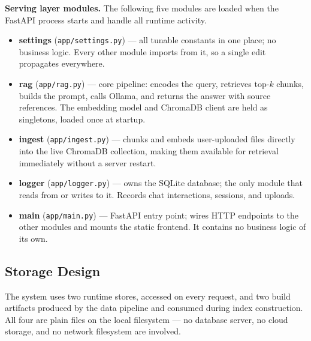 \textbf{Serving layer modules.} The following five modules are loaded when
the FastAPI process starts and handle all runtime activity.
\begin{itemize}
    \item \textbf{settings} (\texttt{app/settings.py}) --- all tunable
    constants in one place; no business logic. Every other module imports
    from it, so a single edit propagates everywhere.

    \item \textbf{rag} (\texttt{app/rag.py}) --- core pipeline: encodes the
    query, retrieves top-$k$ chunks, builds the prompt, calls Ollama, and
    returns the answer with source references. The embedding model and
    ChromaDB client are held as singletons, loaded once at startup.

    \item \textbf{ingest} (\texttt{app/ingest.py}) --- chunks and embeds
    user-uploaded files directly into the live ChromaDB collection, making
    them available for retrieval immediately without a server restart.

    \item \textbf{logger} (\texttt{app/logger.py}) --- owns the SQLite
    database; the only module that reads from or writes to it. Records chat
    interactions, sessions, and uploads.

    \item \textbf{main} (\texttt{app/main.py}) --- FastAPI entry point;
    wires HTTP endpoints to the other modules and mounts the static frontend.
    It contains no business logic of its own.
\end{itemize}

\subsection{Storage Design}
\label{sec:design-storage}

The system uses two runtime stores, accessed on every request, and two
build artifacts produced by the data pipeline and consumed during index
construction. All four are plain files on the local filesystem — no
database server, no cloud storage, and no network filesystem are involved.

